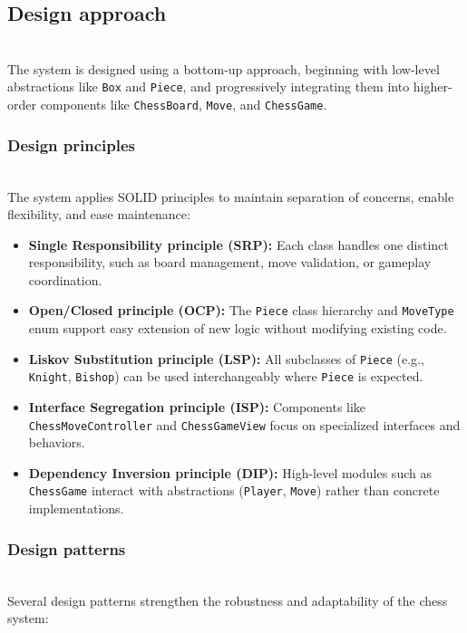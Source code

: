 \subsection{Design approach}\label{JrNmQGYOCEWV2dy6b3MN3}
\\
The system is designed using a bottom-up approach, beginning with low-level abstractions like \texttt{Box} and \texttt{Piece}, and progressively integrating them into higher-order components like \texttt{ChessBoard}, \texttt{Move}, and \texttt{ChessGame}.

\subsubsection{Design principles}\label{gmPN8xJeNQxEZewRGtQJt}
\\
The system applies SOLID principles to maintain separation of concerns, enable flexibility, and ease maintenance:

\begin{itemize}
\item
\protect{}\label{AU9ALGJ3F-AvmD5OAPTAI}
\textbf{Single Responsibility principle (SRP):} Each class handles one distinct responsibility, such as board management, move validation, or gameplay coordination.
\item
\protect{}\label{Iv86PxR_nHoMAstsCK3x6}
\textbf{Open/Closed principle (OCP):} The \texttt{Piece} class hierarchy and \texttt{MoveType} enum support easy extension of new logic without modifying existing code.
\item
\protect{}\label{kGy4f8eyTJUseN7295XwU}
\textbf{Liskov Substitution principle (LSP):} All subclasses of \texttt{Piece} (e.g., \texttt{Knight}, \texttt{Bishop}) can be used interchangeably where \texttt{Piece} is expected.
\item
\protect{}\label{g-MvTnUv965bf1Kluq8i-}
\textbf{Interface Segregation principle (ISP):} Components like \texttt{ChessMoveController} and \texttt{ChessGameView} focus on specialized interfaces and behaviors.
\item
\protect{}\label{1d8xOVFuBuvxIuq7gjk8j}
\textbf{Dependency Inversion principle (DIP):} High-level modules such as \texttt{ChessGame} interact with abstractions (\texttt{Player}, \texttt{Move}) rather than concrete implementations.
\end{itemize}

\subsubsection{Design patterns}\label{97-pdb-o0K-dfWCmMS3Mf}
\\
Several design patterns strengthen the robustness and adaptability of the chess system:

